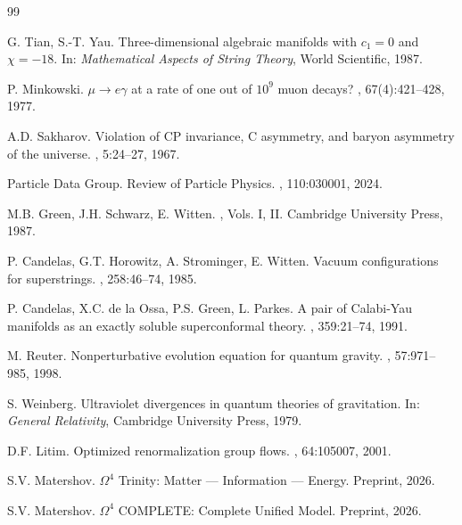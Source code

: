 \documentclass[12pt,a4paper,twoside]{article}
\theoremstyle{definition}
\begin{document}
\begin{thebibliography}{99}

G. Tian, S.-T. Yau.
\newblock Three-dimensional algebraic manifolds with $c_1 = 0$ and $\chi = -18$.
\newblock In: {\em Mathematical Aspects of String Theory}, World Scientific, 1987.

P. Minkowski.
\newblock $\mu \to e\gamma$ at a rate of one out of $10^9$ muon decays?
, 67(4):421--428, 1977.

A.D. Sakharov.
\newblock Violation of CP invariance, C asymmetry, and baryon asymmetry of the universe.
, 5:24--27, 1967.

Particle Data Group.
\newblock Review of Particle Physics.
, 110:030001, 2024.

M.B. Green, J.H. Schwarz, E. Witten.
, Vols. I, II.
\newblock Cambridge University Press, 1987.

P. Candelas, G.T. Horowitz, A. Strominger, E. Witten.
\newblock Vacuum configurations for superstrings.
, 258:46--74, 1985.

P. Candelas, X.C. de la Ossa, P.S. Green, L. Parkes.
\newblock A pair of Calabi-Yau manifolds as an exactly soluble superconformal theory.
, 359:21--74, 1991.

M. Reuter.
\newblock Nonperturbative evolution equation for quantum gravity.
, 57:971--985, 1998.

S. Weinberg.
\newblock Ultraviolet divergences in quantum theories of gravitation.
\newblock In: {\em General Relativity}, Cambridge University Press, 1979.

D.F. Litim.
\newblock Optimized renormalization group flows.
, 64:105007, 2001.

S.V. Matershov.
\newblock $\Omega^4$ Trinity: Matter — Information — Energy.
\newblock Preprint, 2026.

S.V. Matershov.
\newblock $\Omega^4$ COMPLETE: Complete Unified Model.
\newblock Preprint, 2026.


\end{thebibliography}
\end{document}
